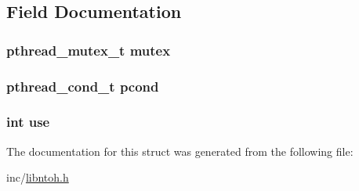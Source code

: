 \subsection{Field Documentation}
\hypertarget{structntoh__lock__t_a4acff8232e4aec9cd5c6dc200ac55ef3}{
\subsubsection[{mutex}]{\setlength{\rightskip}{0pt plus 5cm}pthread\-\_\-mutex\-\_\-t mutex}}\label{structntoh__lock__t_a4acff8232e4aec9cd5c6dc200ac55ef3}
\hypertarget{structntoh__lock__t_ae7a6f0d43d482747235ce5732dfd16eb}{
\subsubsection[{pcond}]{\setlength{\rightskip}{0pt plus 5cm}pthread\-\_\-cond\-\_\-t pcond}}\label{structntoh__lock__t_ae7a6f0d43d482747235ce5732dfd16eb}
\hypertarget{structntoh__lock__t_a7fa111673285c27a59c5ef465c1ab63b}{
\subsubsection[{use}]{\setlength{\rightskip}{0pt plus 5cm}int use}}\label{structntoh__lock__t_a7fa111673285c27a59c5ef465c1ab63b}


The documentation for this struct was generated from the following file\-:\begin{DoxyCompactItemize}
\item 
inc/\hyperlink{libntoh_8h}{libntoh.\-h}\end{DoxyCompactItemize}
